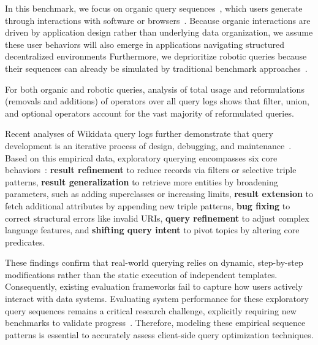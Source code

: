 In this benchmark, we focus on organic query sequences~\cite{zhang2020characterizing}, 
which users generate through interactions with software or browsers~\cite{malyshev2018getting}.
Because organic interactions are driven by application design rather than underlying data organization, 
we assume these user behaviors will also emerge in applications navigating structured decentralized environments
Furthermore, we deprioritize robotic queries because their sequences can 
already be simulated by traditional benchmark approaches~\cite{taelman2023link,bizer2011berlin,alucc2014diversified}.

For both organic and robotic queries, analysis of total usage and reformulations (removals and additions) 
of operators over all query logs shows that filter, union, and optional operators account for the vast majority of reformulated queries.

Recent analyses of Wikidata query logs further demonstrate that query development is an iterative process of design,
debugging, and maintenance~\cite{arenas2025exploring}.
Based on this empirical data, 
exploratory querying encompasses six core behaviors~\cite{arenas2025exploring}:
\textbf{result refinement} to reduce records via filters or selective triple patterns,
\textbf{result generalization} to retrieve more entities by broadening parameters,
such as adding superclasses or increasing limits,
\textbf{result extension} to fetch additional attributes by appending new triple patterns,
\textbf{bug fixing} to correct structural errors like invalid URIs,
\textbf{query refinement} to adjust complex language features,
and \textbf{shifting query intent} to pivot topics by altering core predicates.

These findings confirm that real-world querying relies on dynamic, step-by-step modifications rather than the static execution of independent templates.
Consequently, existing evaluation frameworks fail to capture how users actively interact with data systems. 
Evaluating system performance for these exploratory query sequences remains a critical research challenge, 
explicitly requiring new benchmarks to validate progress~\cite{arenas2025exploring}. 
Therefore, modeling these empirical sequence patterns is essential to accurately assess client-side 
query optimization techniques.